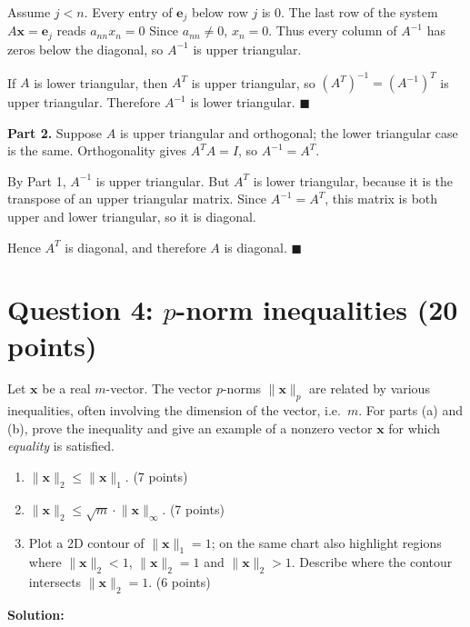 \documentclass[11pt]{article}
\begin{document}
Assume $j < n$. Every entry of $\mathbf{e}_j$ below row $j$ is $0$. The last row of the system $A\mathbf{x} = \mathbf{e}_j$ reads $a_{nn}x_n = 0$
Since $a_{nn} \neq 0$, $x_n = 0$.
Thus every column of $A^{-1}$ has zeros below the diagonal, so $A^{-1}$ is upper triangular.

If $A$ is lower triangular, then $A^T$ is upper triangular, so $(A^T)^{-1} = (A^{-1})^T$ is upper triangular. 
Therefore $A^{-1}$ is lower triangular. $\blacksquare$

\bigskip

\textbf{Part 2.} Suppose $A$ is upper triangular and orthogonal; the lower triangular case is the same. Orthogonality gives $A^TA = I$, so $A^{-1} = A^T$.

By Part 1, $A^{-1}$ is upper triangular. But $A^T$ is lower triangular, because it is the transpose of an upper triangular matrix. Since $A^{-1} = A^T$, this matrix is both upper and lower triangular, so it is diagonal.

Hence $A^T$ is diagonal, and therefore $A$ is diagonal. $\blacksquare$
\bigskip


\newpage
\section*{Question 4: $p$-norm inequalities (20 points)}

Let $\mathbf{x}$ be a real $m$-vector. The vector $p$-norms $\lVert \mathbf{x} \rVert_{p}$ are related by various inequalities, often involving the dimension of the vector, i.e.\ $m$. For parts (a) and (b), prove the inequality and give an example of a nonzero vector $\mathbf{x}$ for which \textit{equality} is satisfied.
\begin{enumerate}
    \item[(a)] $\lVert \mathbf{x} \rVert_2 \le \lVert \mathbf{x} \rVert_1$. (7 points)
    \item[(b)] $\lVert \mathbf{x} \rVert_2 \le \sqrt{m} \cdot \lVert \mathbf{x} \rVert_\infty$. (7 points)
    \item[(c)] Plot a 2D contour of $\lVert \mathbf{x} \rVert_1 = 1$; on the same chart also highlight regions where $\lVert \mathbf{x}\rVert_2 < 1$, $\lVert \mathbf{x}\rVert_2 = 1$ and $\lVert \mathbf{x}\rVert_2 > 1$. Describe where the contour intersects $\lVert \mathbf{x} \rVert_2 = 1$. (6 points)
\end{enumerate}

\textbf{Solution:}
\end{document}
